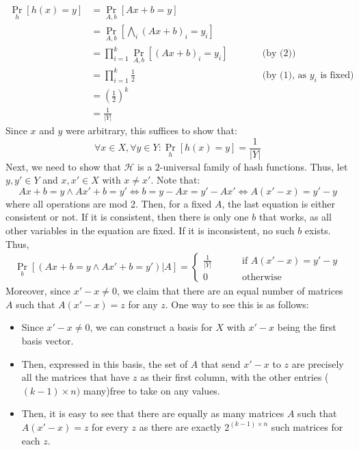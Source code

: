 \documentclass[12pt]{article}
\begin{document}
\begin{solution}
\begin{align*}
        \Pr_h[h(x) = y] &= \Pr_{A,b}[Ax+b = y] \\
        &= \Pr_{A,b}\left[\bigwedge_i (Ax+b)_i = y_i\right] \\
        &= \prod_{i=1}^k \Pr_{A,b}\left[(Ax+b)_i = y_i\right] \qquad &&\text{(by (2))} \\
        &= \prod_{i=1}^k \frac{1}{2}  \qquad &&\text{(by (1), as $y_i$ is fixed)}\\
        &= \left(\frac{1}{2}\right)^k \\
        &= \frac{1}{|Y|}
    \end{align*}
    Since $x$ and $y$ were arbitrary, this suffices to show that: 
    \[\forall x \in X, \forall y \in Y: \Pr_h[h(x) = y] = \frac{1}{|Y|} \]
    Next, we need to show that $\mathcal{H}$ is a $2$-universal family of hash functions. Thus, let $y, y' \in Y$ and $x, x' \in X$ with $x \neq x'$. Note that: 
    \[ Ax+b = y \wedge Ax'+b = y' \iff b = y-Ax = y'-Ax' \iff A(x'-x) = y'-y\]
    where all operations are mod 2. Then, for a fixed $A$, the last equation is either consistent or not. If it is consistent, then there is only one $b$ that works, as all other variables in the equation are fixed. If it is inconsistent, no such $b$ exists. Thus, 
    \begin{align*}
        \Pr_b[(Ax+b = y \land Ax'+b = y')| A] = \begin{cases}
        \frac{1}{|Y|} \qquad &\text{ if } A(x'-x) = y'-y \\
        0 \qquad &\text{ otherwise }
        \end{cases}     
    \end{align*}
    Moreover, since $x'-x \neq 0$, we claim that there are an equal number of matrices $A$ such that $A(x'-x) = z$ for any $z$. One way to see this is as follows: 
    \begin{itemize}
        \item Since $x'-x \neq 0$, we can construct a basis for $X$ with $x'-x$ being the first basis vector.
        \item Then, expressed in this basis, the set of $A$ that send $x'-x$ to $z$ are precisely all the matrices that have $z$ as their first column, with the other entries ($(k-1) \times n)$ many)free to take on any values.
        \item Then, it is easy to see that there are equally as many matrices $A$ such that $A(x'-x) = z$ for every $z$ as there are exactly $2^{(k-1) \times n }$ such matrices for each $z$.
    \end{itemize}

\end{solution}
\end{document}
